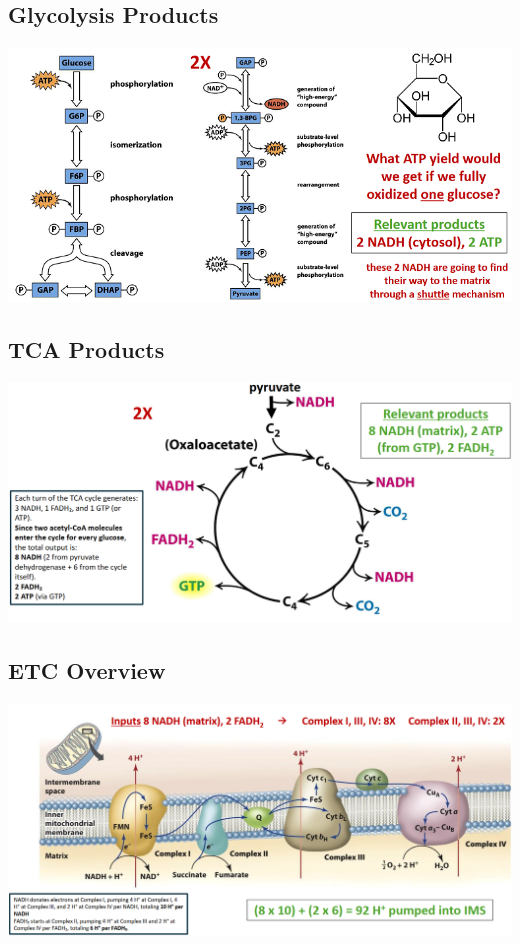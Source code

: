 \documentclass[10pt]{article}
\begin{document}
\subsection*{Glycolysis Products}
\begin{center} 
	\includegraphics*[width=\textwidth]{L3_11.png}
\end{center}

\subsection*{TCA Products}
\begin{center} 
	\includegraphics*[width=\textwidth]{L3_12.png}
\end{center}

\subsection*{ETC Overview}
\begin{center} 
	\includegraphics*[width=\textwidth]{L3_13.png}
\end{center}
\end{document}
